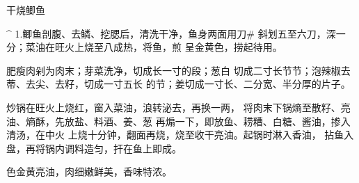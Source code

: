 \begin{recipe}{干烧鲫鱼}

\ingredients



\cooking

^ 1.鲫鱼剖腹、去鳞、挖腮后，清洗干净，鱼身两面用刀# 斜划五至六刀，深一分；菜油在旺火上烧至八成热，将鱼，煎 呈金黄色，捞起待用。

\step 肥瘦肉剁为肉末；芽菜洗净，切成长一寸的段；葱白 切成二寸长节节；泡辣椒去蒂、去尖、去籽，切成一寸五长 的节；姜切成一寸长、二分宽、半分厚的片子。

炒锅在旺火上烧红，窗入菜油，浪转泌去，再换一两， 将肉末下锅熵至散籽、亮油、熵酥，先放盐、料酒、姜、葱 再煽一下，即放鱼、耢糟、白糖、酱油，掺入清汤，在中火 上烧十分钟，翻面再烧，烧至收干亮油。起锅时淋入香油， 拈鱼入盘，再将锅内调料造匀，扞在鱼上即成。

\notes

色金黄亮油，肉细嫩鲜美，香味特浓。

\end{recipe}

